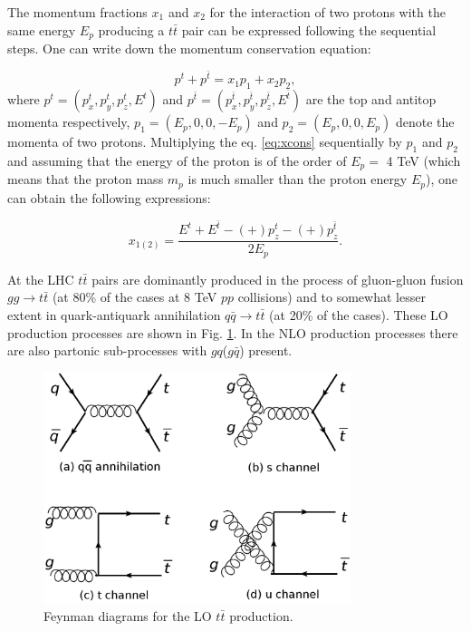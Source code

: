 The momentum fractions $x_{1}$ and $x_{2}$ for the interaction of two protons with the same energy $E_{p}$ producing a $t\bar{t}$ pair can be expressed following 
the sequential steps. One can write down the momentum conservation equation:

\begin{equation}\label{eq:xcons}
 p^{t} + p^{\bar{t}} = x_{1}p_{1} + x_{2}p_{2}, 
\end{equation}
where $p^{t} = (p_{x}^{t}, p_{y}^{t}, p_{z}^{t}, E^{t})$ and $p^{\bar{t}} = (p_{x}^{\bar{t}}, p_{y}^{\bar{t}}, p_{z}^{\bar{t}}, E^{\bar{t}})$ are the top and antitop 
momenta respectively, $p_{1} = (E_{p},0,0, -E_{p})$ and $p_{2}= (E_{p},0,0, E_{p})$ denote the momenta of two protons. Multiplying the eq. \ref{eq:xcons} sequentially 
by $p_{1}$ and $p_{2}$ and assuming that the energy of the proton is of the order of $E_{p} =$ 4 TeV (which means that the proton mass $m_{p}$ is much smaller than 
the proton energy $E_{p}$), one can obtain the following expressions:

\begin{equation}
 x_{1(2)} = \frac{E^{t} + E^{\bar{t}} -(+) p_{z}^{t} -(+)p_{z}^{\bar{t}}}{2E_{p}}.
\end{equation}

At the LHC $t\bar{t}$ pairs are dominantly produced in the process of gluon-gluon fusion $gg \rightarrow t\bar{t}$ (at 80\% of the cases at 8 TeV $pp$ collisions) 
and to somewhat lesser extent in quark-antiquark annihilation $q\bar{q} \rightarrow t\bar{t}$ (at 20\% of the cases). These LO production processes are shown in 
Fig. \ref{fig:LO_tt_prod}. In the NLO production processes there are also partonic sub-processes with $gq$($g\bar{q}$) present.

\begin{figure}[h]
  \centering
  \includegraphics[width=0.8\textwidth]{01_Theory_SM/plots/LO_tt_production_uniform.png}
  \caption{Feynman diagrams for the LO $t\bar{t}$ production.}
  \label{fig:LO_tt_prod}
\end{figure}

